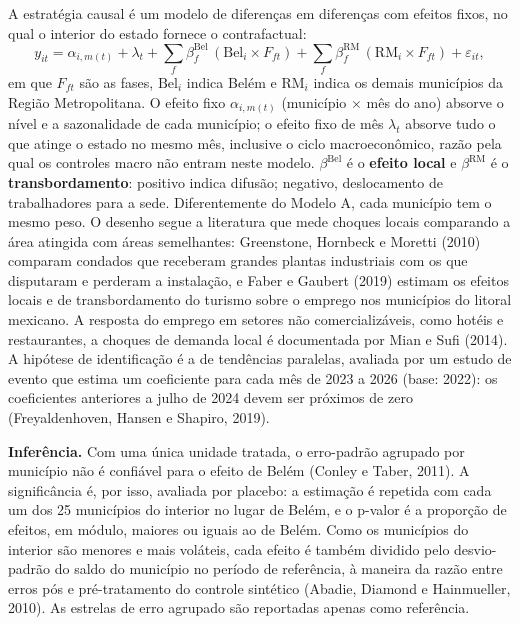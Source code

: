 \documentclass[12pt,a4paper]{article}
\begin{document}
A estratégia causal é um modelo de diferenças em diferenças com efeitos fixos, no qual o interior do
estado fornece o contrafactual:
\begin{equation}
y_{it} = \alpha_{i,m(t)} + \lambda_t + \sum_{f} \beta^{\text{Bel}}_f\,(\text{Bel}_i \times F_{ft})
       + \sum_{f} \beta^{\text{RM}}_f\,(\text{RM}_i \times F_{ft}) + \varepsilon_{it},
\end{equation}
em que $F_{ft}$ são as fases, $\text{Bel}_i$ indica Belém e $\text{RM}_i$ indica os demais municípios
da Região Metropolitana. O efeito fixo $\alpha_{i,m(t)}$ (município $\times$ mês do ano) absorve o
nível e a sazonalidade de cada município; o efeito fixo de mês $\lambda_t$ absorve tudo o que atinge o
estado no mesmo mês, inclusive o ciclo macroeconômico, razão pela qual os controles macro não entram
neste modelo. $\beta^{\text{Bel}}$ é o \textbf{efeito local} e $\beta^{\text{RM}}$ é o
\textbf{transbordamento}: positivo indica difusão; negativo, deslocamento de trabalhadores para a sede.
Diferentemente do Modelo A, cada município tem o mesmo peso. O desenho segue a literatura que mede
choques locais comparando a área atingida com áreas semelhantes: Greenstone, Hornbeck e Moretti (2010)
comparam condados que receberam grandes plantas industriais com os que disputaram e perderam a
instalação, e Faber e Gaubert (2019) estimam os efeitos locais e de transbordamento do turismo sobre o
emprego nos municípios do litoral mexicano. A resposta do emprego em setores não comercializáveis,
como hotéis e restaurantes, a choques de demanda local é documentada por Mian e Sufi (2014). A hipótese de identificação é a de
tendências paralelas, avaliada por um estudo de evento que estima um coeficiente para cada mês de 2023
a 2026 (base: 2022): os coeficientes anteriores a julho de 2024 devem ser próximos de zero
(Freyaldenhoven, Hansen e Shapiro, 2019).

\textbf{Inferência.} Com uma única unidade tratada, o erro-padrão agrupado por município não é
confiável para o efeito de Belém (Conley e Taber, 2011). A significância é, por isso, avaliada por
placebo: a estimação é repetida com cada um dos 25 municípios do interior no lugar de Belém, e o
p-valor é a proporção de efeitos, em módulo, maiores ou iguais ao de Belém. Como os municípios do
interior são menores e mais voláteis, cada efeito é também dividido pelo desvio-padrão do saldo do
município no período de referência, à maneira da razão entre erros pós e pré-tratamento do controle
sintético (Abadie, Diamond e Hainmueller, 2010). As estrelas de erro agrupado são reportadas apenas
como referência.
\end{document}
